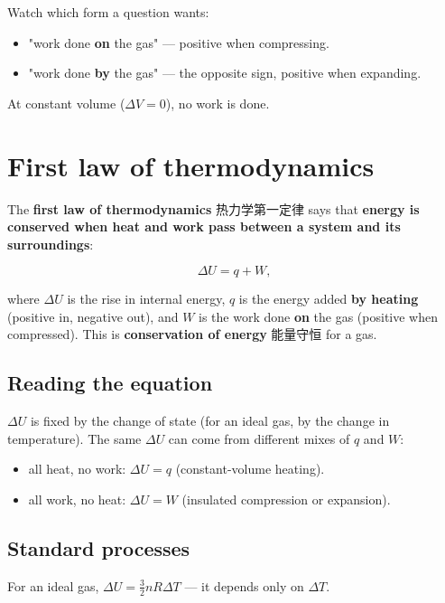 \documentclass[11pt]{article}
\begin{document}
Watch which form a question wants:

\begin{itemize}
\item "work done \textbf{on} the gas" — positive when compressing.

\item "work done \textbf{by} the gas" — the opposite sign, positive when expanding.

\end{itemize}

At constant volume ($\Delta V = 0$), no work is done.

\section*{First law of thermodynamics}

The \textbf{first law of thermodynamics} 热力学第一定律 says that \textbf{energy is conserved when heat and work pass between a system and its surroundings}:

\[
\Delta U = q + W,
\]

where $\Delta U$ is the rise in internal energy, $q$ is the energy added \textbf{by heating} (positive in, negative out), and $W$ is the work done \textbf{on} the gas (positive when compressed). This is \textbf{conservation of energy} 能量守恒 for a gas.

\subsection*{Reading the equation}

$\Delta U$ is fixed by the change of state (for an ideal gas, by the change in temperature). The same $\Delta U$ can come from different mixes of $q$ and $W$:

\begin{itemize}
\item all heat, no work: $\Delta U = q$ (constant-volume heating).

\item all work, no heat: $\Delta U = W$ (insulated compression or expansion).

\end{itemize}

\subsection*{Standard processes}

For an ideal gas, $\Delta U = \tfrac{3}{2} n R \Delta T$ — it depends only on $\Delta T$.
\end{document}
